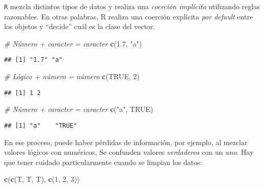 \documentclass[]{article}
\newenvironment{Shaded}{\begin{snugshade}}{\end{snugshade}}
\newcommand{\KeywordTok}[1]{\textcolor[rgb]{0.13,0.29,0.53}{\textbf{#1}}}
\newcommand{\DecValTok}[1]{\textcolor[rgb]{0.00,0.00,0.81}{#1}}
\newcommand{\FloatTok}[1]{\textcolor[rgb]{0.00,0.00,0.81}{#1}}
\newcommand{\StringTok}[1]{\textcolor[rgb]{0.31,0.60,0.02}{#1}}
\newcommand{\CommentTok}[1]{\textcolor[rgb]{0.56,0.35,0.01}{\textit{#1}}}
\newcommand{\OtherTok}[1]{\textcolor[rgb]{0.56,0.35,0.01}{#1}}
\newcommand{\NormalTok}[1]{#1}
\begin{document}
\texttt{R} mezcla distintos tipos de datos y realiza una \emph{coerción
implícita} utilizando reglas razonables. En otras palabras, R realiza
una coerción explícita \emph{por default} entre los objetos y ``decide''
cuál es la clase del vector.

\begin{Shaded}
\begin{Highlighting}[]
\CommentTok{# Número + caracter = caracter}
\KeywordTok{c}\NormalTok{(}\FloatTok{1.7}\NormalTok{, }\StringTok{"a"}\NormalTok{)}
\end{Highlighting}
\end{Shaded}

\begin{verbatim}
## [1] "1.7" "a"
\end{verbatim}

\begin{Shaded}
\begin{Highlighting}[]
\CommentTok{# Lógico + número = número}
\KeywordTok{c}\NormalTok{(}\OtherTok{TRUE}\NormalTok{, }\DecValTok{2}\NormalTok{)}
\end{Highlighting}
\end{Shaded}

\begin{verbatim}
## [1] 1 2
\end{verbatim}

\begin{Shaded}
\begin{Highlighting}[]
\CommentTok{# Número + caracter = caracter}
\KeywordTok{c}\NormalTok{(}\StringTok{"a"}\NormalTok{, }\OtherTok{TRUE}\NormalTok{)}
\end{Highlighting}
\end{Shaded}

\begin{verbatim}
## [1] "a"    "TRUE"
\end{verbatim}

En ese proceso, puede haber pérdidas de información, por ejemplo, al
mezclar valores lógicos con numéricos, Se confunden valores
\emph{verdaderos} con un \emph{uno}. Hay que tener cuidado
particularmente cuando se limpian los datos:

\begin{Shaded}
\begin{Highlighting}[]
\KeywordTok{c}\NormalTok{(}\KeywordTok{c}\NormalTok{(T, T, T), }\KeywordTok{c}\NormalTok{(}\DecValTok{1}\NormalTok{, }\DecValTok{2}\NormalTok{, }\DecValTok{3}\NormalTok{))}
\end{Highlighting}
\end{Shaded}
\end{document}
